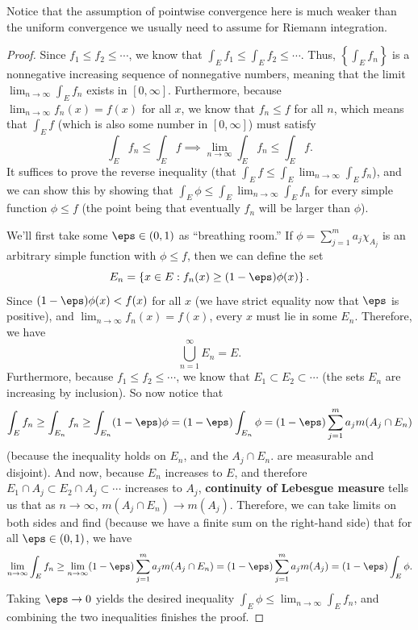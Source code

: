 Notice that the assumption of pointwise convergence here is much weaker than the uniform convergence we usually need to assume for Riemann integration.

\begin{proof}
Since $f_1 \le f_2 \le \cdots$, we know that $\int_E f_1 \le \int_E f_2 \le \cdots$. Thus, $\left\{\int_E f_n\right\}$ is a nonnegative increasing sequence of nonnegative numbers, meaning that the limit $\lim_{n \to \infty} \int_E f_n$ exists in $[0, \infty]$. Furthermore, because $\lim_{n \to \infty} f_n(x) = f(x)$ for all $x$, we know that $f_n \le f$ for all $n$, which means that $\int_E f$ (which is also some number in $[0, \infty]$) must satisfy 
\[
    \int_E f_n \le \int_E f \implies \lim_{n \to \infty}\int_E f_n \le \int_E f.
\]
It suffices to prove the reverse inequality (that $\int_E f \le \int_E \lim_{n \to \infty}\int_E f_n$), and we can show this by showing that $\int_E \phi \le \int_E \lim_{n \to \infty}\int_E f_n$ for every simple function $\phi \le f$ (the point being that eventually $f_n$ will be larger than $\phi$). 

We'll first take some $\eps \in (0, 1)$ as ``breathing room.'' If $\phi = \sum_{j=1}^m a_j \chi_{A_j}$ is an arbitrary simple function with $\phi \le f$, then we can define the set
\[
    E_n = \left\{x \in E: f_n(x) \ge (1- \eps) \phi(x)\right\}.
\]
Since $(1 - \eps) \phi(x) < f(x)$ for all $x$ (we have strict equality now that $\eps$ is positive), and $\lim_{n \to \infty} f_n(x) = f(x)$, every $x$ must lie in some $E_n$. Therefore, we have
\[
    \bigcup_{n=1}^{\infty} E_n = E.
\]
Furthermore, because $f_1 \le f_2 \le \cdots$, we know that $E_1 \subset E_2 \subset \cdots$ (the sets $E_n$ are increasing by inclusion). So now notice that
\[
    \int_E f_n \ge \int_{E_n} f_n \ge \int_{E_n} (1 - \eps) \phi = (1-\eps) \int_{E_n} \phi = (1 - \eps) \sum_{j=1}^m a_j m(A_j \cap E_n)
\]
(because the inequality holds on $E_n$, and the $A_j \cap E_n$. are measurable and disjoint). And now, because $E_n$ increases to $E$, and therefore $E_1 \cap A_j \subset E_2 \cap A_j \subset \cdots$ increases to $A_j$, \textbf{continuity of Lebesgue measure} tells us that as $n \to \infty$, $m(A_j \cap E_n) \to m(A_j)$. Therefore, we can take limits on both sides and find (because we have a finite sum on the right-hand side) that for all $\eps \in (0, 1)$, we have
\[
    \lim_{n \to \infty} \int_E f_n \ge \lim_{n \to \infty} (1 - \eps) \sum_{j=1}^m a_j m(A_j \cap E_n) = (1 - \eps) \sum_{j=1}^m a_j m(A_j) = (1 - \eps) \int_E \phi.
\]
Taking $\eps \to 0$ yields the desired inequality $\int_E \phi \le \lim_{n \to \infty} \int_E f_n$, and combining the two inequalities finishes the proof.
\end{proof}

